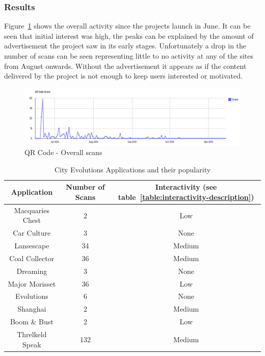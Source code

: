 \documentclass[a4paper,12pt]{article}
\begin{document}
\subsubsection{Results}
Figure~\ref{QR-overall-access-overTime} shows the overall activity since the projects launch in June. 
It can be seen that initial interest was high, the peaks can be explained by the amount of advertisement the project saw in its early stages. 
Unfortunately a drop in the number of scans can be seen representing little to no activity at any of the sites from August onwards.
Without the advertisement it appears as if the content delivered by the project is not enough to keep users interested or motivated.

\begin{figure}[ht!]
	\centering
	\includegraphics[width=150mm]{./images/OverallQRCodeDownload}
	\caption{QR Code - Overall scans}
	\label{QR-overall-access-overTime}
\end{figure}

\begin{table}[ht!]
	\centering
	\begin{tabular}{|c|c|c|}\hline
		\textbf{Application} & 	\textbf{Number of Scans} & \textbf{Interactivity (see table~\ref{table:interactivity-description})} \\\hline
		Macquaries Chest & 2 & Low\\
		Car Culture & 3 & None\\
		Lansescape & 34 & Medium\\
		Coal Collector & 36 & Medium\\
		Dreaming & 3 & None\\
		Major Morisset & 36 & Low\\
		Evolutions & 6 & None\\
		Shanghai & 2 & Medium\\
		Boom \& Bust & 2 & Low\\
		Threlkeld Speak	&	132 & Medium\\\hline
	\end{tabular}
	\caption{City Evolutions Applications and their popularity}
	\label{table:application-popularity}
\end{table}
\end{document}
